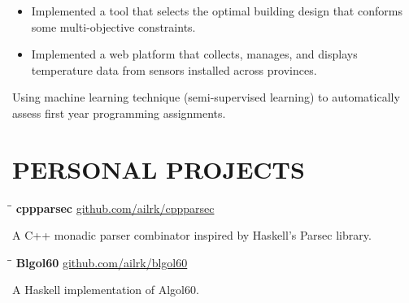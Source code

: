 \documentclass{resume}
\begin{document}
    \begin{itemize}
        \item Implemented a tool that selects the optimal building design that conforms some multi-objective constraints.

        \item Implemented a web platform that collects, manages, and displays temperature data from sensors installed across provinces.
    \end{itemize}

     \vspace{-0.1in}

        Using machine learning technique (semi-supervised learning) to automatically assess first year programming assignments.

     \vspace{-0.1in}

\section{PERSONAL PROJECTS}

    \begin{tabbing}
        \hspace{2.4in}\= \hspace{2in}\= \kill
        {\bf cppparsec } \>               \>\url{github.com/ailrk/cppparsec}\\
    \end{tabbing}

    \vspace{-0.3in}
    A C++ monadic parser combinator inspired by Haskell's Parsec library.
    \vspace{-0.15in}

    \begin{tabbing}
        \hspace{2.4in}\= \hspace{2in}\= \kill
        {\bf Blgol60 } \>               \>\url{github.com/ailrk/blgol60}\\

    \end{tabbing}
    \vspace{-0.3in}
    A Haskell implementation of Algol60.
    \vspace{-0.1in}
\end{document}
